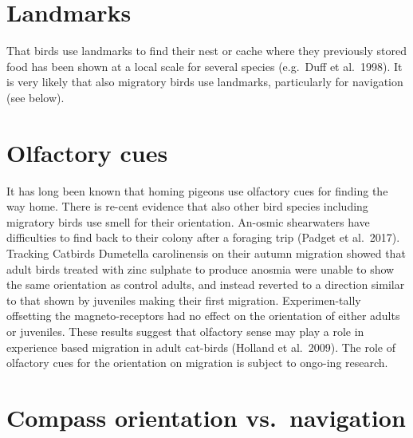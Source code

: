 \documentclass[
]{book}
\begin{document}
\hypertarget{landmarks}{%
\section{Landmarks}\label{landmarks}}

That birds use landmarks to find their nest or cache where they previously stored food has been shown at a local scale for several species (e.g.~Duff et al.~1998). It is very likely that also migratory birds use landmarks, particularly for navigation (see below).

\hypertarget{olfactory-cues}{%
\section{Olfactory cues}\label{olfactory-cues}}

It has long been known that homing pigeons use olfactory cues for finding the way home. There is re-cent evidence that also other bird species including migratory birds use smell for their orientation. An-osmic shearwaters have difficulties to find back to their colony after a foraging trip (Padget et al.~2017). Tracking Catbirds Dumetella carolinensis on their autumn migration showed that adult birds treated with zinc sulphate to produce anosmia were unable to show the same orientation as control adults, and instead reverted to a direction similar to that shown by juveniles making their first migration. Experimen-tally offsetting the magneto-receptors had no effect on the orientation of either adults or juveniles. These results suggest that olfactory sense may play a role in experience based migration in adult cat-birds (Holland et al.~2009). The role of olfactory cues for the orientation on migration is subject to ongo-ing research.

\hypertarget{compass-orientation-vs.-navigation}{%
\section{Compass orientation vs.~navigation}\label{compass-orientation-vs.-navigation}}
\end{document}
